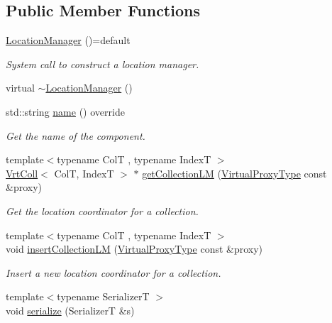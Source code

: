 \subsection*{Public Member Functions}
\begin{DoxyCompactItemize}
\item 
\hyperlink{structvt_1_1location_1_1_location_manager_af5cf57c9ef31ccf5b207394cbd9363ee}{Location\+Manager} ()=default
\begin{DoxyCompactList}\small\item\em System call to construct a location manager. \end{DoxyCompactList}\item 
virtual \hyperlink{structvt_1_1location_1_1_location_manager_abdcd3feb1f6e7c22f88582ad87799de1}{$\sim$\+Location\+Manager} ()
\item 
std\+::string \hyperlink{structvt_1_1location_1_1_location_manager_afdb88906b8c4b5535f239d6581f840e0}{name} () override
\begin{DoxyCompactList}\small\item\em Get the name of the component. \end{DoxyCompactList}\item 
{\footnotesize template$<$typename ColT , typename IndexT $>$ }\\\hyperlink{structvt_1_1location_1_1_location_manager_a189fc3b436520c19aada9623a6b4a42e}{Vrt\+Coll}$<$ ColT, IndexT $>$ $\ast$ \hyperlink{structvt_1_1location_1_1_location_manager_a2d95ed25544679c16a84a173e84b92b6}{get\+Collection\+LM} (\hyperlink{namespacevt_a1b417dd5d684f045bb58a0ede70045ac}{Virtual\+Proxy\+Type} const \&proxy)
\begin{DoxyCompactList}\small\item\em Get the location coordinator for a collection. \end{DoxyCompactList}\item 
{\footnotesize template$<$typename ColT , typename IndexT $>$ }\\void \hyperlink{structvt_1_1location_1_1_location_manager_ae62f2826ad6bebc5dcad0d6ad13af365}{insert\+Collection\+LM} (\hyperlink{namespacevt_a1b417dd5d684f045bb58a0ede70045ac}{Virtual\+Proxy\+Type} const \&proxy)
\begin{DoxyCompactList}\small\item\em Insert a new location coordinator for a collection. \end{DoxyCompactList}\item 
{\footnotesize template$<$typename SerializerT $>$ }\\void \hyperlink{structvt_1_1location_1_1_location_manager_a3f0b20c13abb9fcaf610fb3c62b324d5}{serialize} (SerializerT \&s)
\end{DoxyCompactItemize}
